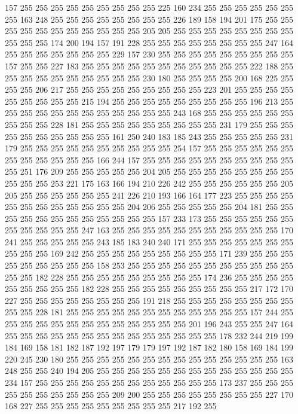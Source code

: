 157 255 255 255 255 255 255 255 255 255 225 160 234 255 255 255 255 255 255 255
163 248 255 255 255 255 255 255 255 255 226 189 158 194 201 175 255 255 255 255
255 255 255 255 255 255 255 205 205 255 255 255 255 255 255 255 255 255 255 255
174 200 194 157 191 228 255 255 255 255 255 255 255 255 247 164 255 255 255 255
255 255 255 229 157 230 255 255 255 255 255 255 255 255 255 157 255 255 227 183
255 255 255 255 255 255 255 255 255 255 255 222 188 255 255 255 255 255 255 255
255 255 255 230 180 255 255 255 255 200 168 225 255 255 255 206 217 255 255 255
255 255 255 255 255 255 223 201 255 255 255 255 255 255 255 255 255 215 194 255
255 255 255 255 255 255 255 255 196 213 255 255 255 255 255 255 255 255 255 255
255 255 243 168 255 255 255 255 255 255 255 255 255 228 181 255 255 255 255 255
255 255 255 255 231 179 255 255 255 255 255 255 255 255 255 255 161 250 240 183
185 243 255 255 255 255 255 231 179 255 255 255 255 255 255 255 255 255 255 254
157 255 255 255 255 255 255 255 255 255 255 255 255 166 244 157 255 255 255 255
255 255 255 255 255 255 255 251 176 209 255 255 255 255 255 204 205 255 255 255
255 255 255 255 255 255 255 255 253 221 175 163 166 194 210 226 242 255 255 255
255 255 255 205 205 255 255 255 255 255 255 241 226 210 193 166 164 177 223 255
255 255 255 255 255 255 255 255 255 255 255 204 206 255 255 255 255 255 204 181
255 255 255 255 255 255 255 255 255 255 255 255 157 233 173 255 255 255 255 255
255 255 255 255 255 255 247 163 255 255 255 255 255 255 255 255 255 255 255 170
241 255 255 255 255 255 243 185 183 240 240 171 255 255 255 255 255 255 255 255
255 255 169 242 255 255 255 255 255 255 255 255 255 171 239 255 255 255 255 255
255 255 255 255 158 253 255 255 255 255 255 255 255 255 255 255 255 255 255 182
228 255 255 255 255 255 255 255 255 255 174 236 255 255 255 255 255 255 255 255
255 182 228 255 255 255 255 255 255 255 255 255 217 172 170 227 255 255 255 255
255 255 255 255 191 218 255 255 255 255 255 255 255 255 255 255 228 181 255 255
255 255 255 255 255 255 255 255 255 255 157 244 255 255 255 255 255 255 255 255
255 255 255 255 255 201 196 243 255 255 247 164 255 255 255 255 255 255 255 255
255 255 255 255 255 255 178 232 244 219 199 184 169 158 181 182 187 192 197 179
179 197 192 187 182 180 158 169 184 199 220 245 230 180 255 255 255 255 255 255
255 255 255 255 255 255 255 255 163 248 255 255 240 194 205 255 255 255 255 255
255 255 255 255 255 255 255 255 234 157 255 255 255 255 255 255 255 255 255 255
255 255 173 237 255 255 255 255 255 255 255 255 255 255 209 200 255 255 255 255
255 255 255 255 227 170 168 227 255 255 255 255 255 255 255 255 255 217 192 255
